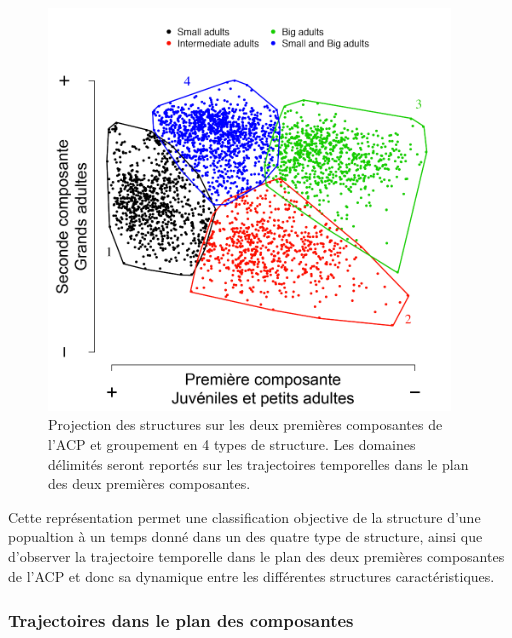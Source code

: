 \begin{figure}[!ht]
\begin{center}
\includegraphics[width=0.95\textwidth]{1_CorpsDeThese/Resumes/Fig/SP03}
\caption[Projection des données
sur les deux premières composantes]{Projection des structures sur les deux
premières composantes de l'ACP et groupement en 4 types de structure. Les
domaines délimités seront reportés sur les trajectoires temporelles dans le
plan des deux premières composantes.}
\label{fig:SP3}
\end{center}
\end{figure}

Cette représentation permet une classification objective de la structure d'une
popualtion à un temps donné dans un des quatre type de structure, ainsi que
d'observer la trajectoire temporelle dans le plan des deux premières composantes
de l'ACP et donc sa dynamique entre les différentes structures caractéristiques. 

\subsubsection{Trajectoires dans le plan des composantes}

